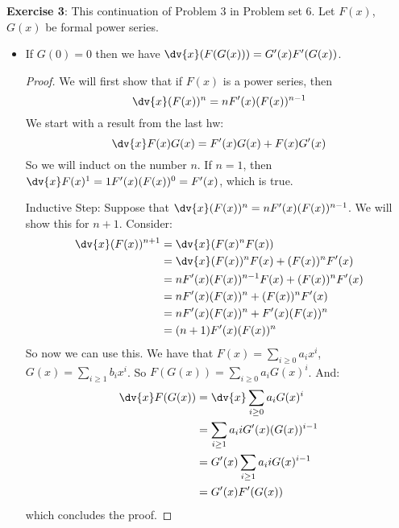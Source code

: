 \documentclass{article}
\begin{document}
\textbf{Exercise 3}: This continuation of Problem $3$ in Problem set $6$. Let $F(x)$, $G(x)$ be formal power series.
    \begin{itemize}
        \item If $G(0) = 0$ then we have $\dv{x}(F(G(x))) = G^{\prime}(x)F^{\prime}(G(x))$.
            \begin{proof}
                We will first show that if $F(x)$ is a power series, then 
                    \begin{equation*}
                        \dv{x}(F(x))^{n} = nF^{\prime}(x)(F(x))^{n - 1}
                    \end{equation*}
                We start with a result from the last hw:
                    \begin{equation*}
                        \dv{x}F(x)G(x) = F^{\prime}(x)G(x) + F(x)G^{\prime}(x)
                    \end{equation*}
                So we will induct on the number $n$. If $n = 1$, then $\dv{x}F(x)^{1} = 1F^{\prime}(x)(F(x))^{0} = F^{\prime}(x)$, which is true.

                Inductive Step: Suppose that $\dv{x}(F(x))^{n} = nF^{\prime}(x)(F(x))^{n - 1}$. We will show this for $n + 1$. Consider:
                    \begin{align*}
                        \dv{x}(F(x))^{n + 1} &= \dv{x}(F(x)^{n}F(x))                                       \\
                                             &= \dv{x}(F(x))^{n}F(x) + (F(x))^{n}F^{\prime}(x)             \\
                                             &= nF^{\prime}(x)(F(x))^{n - 1}F(x) + (F(x))^{n}F^{\prime}(x) \\
                                             &= nF^{\prime}(x)(F(x))^{n} + (F(x))^{n}F^{\prime}(x)         \\
                                             &= nF^{\prime}(x)(F(x))^{n} + F^{\prime}(x)(F(x))^{n}         \\
                                             &= (n + 1)F^{\prime}(x)(F(x))^{n}                               
                    \end{align*}
                So now we can use this. We have that $F(x) = \sum_{i \geq 0}a_{i}x^{i}$, $G(x) = \sum_{i \geq 1}b_{i}x^{i}$. So $F(G(x)) = \sum_{i \geq 0}a_{i}G(x)^{i}$. And:
                    \begin{align*}
                        \dv{x}F(G(x)) &= \dv{x}\sum_{i \geq 0}a_{i}G(x)^{i}               \\
                                      &= \sum_{i \geq 1}a_{i}iG^{\prime}(x)(G(x))^{i - 1} \\
                                      &= G^{\prime}(x)\sum_{i \geq 1}a_{i}iG(x)^{i - 1}   \\
                                      &= G^{\prime}(x)F^{\prime}(G(x))                      
                    \end{align*}
                which concludes the proof.
            \end{proof}


\end{itemize}
\end{document}
